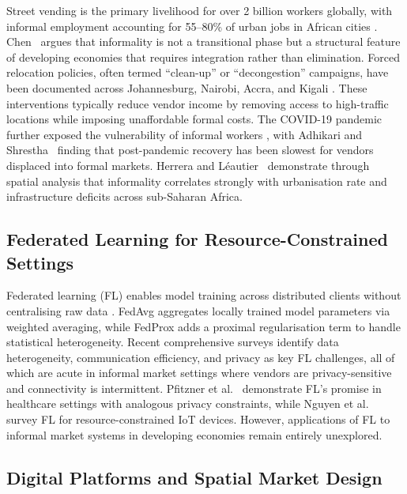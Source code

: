 \documentclass{article}
\begin{document}
Street vending is the primary livelihood for over 2 billion workers globally, with informal employment accounting for 55--80\% of urban jobs in African cities \cite{ilo2023weso}.
Chen~ argues that informality is not a transitional phase but a structural feature of developing economies that requires integration rather than elimination.
Forced relocation policies, often termed ``clean-up'' or ``decongestion'' campaigns, have been documented across Johannesburg, Nairobi, Accra, and Kigali \cite{roever2023street}.
These interventions typically reduce vendor income by removing access to high-traffic locations while imposing unaffordable formal costs.
The COVID-19 pandemic further exposed the vulnerability of informal workers \cite{skinner2021covid}, with Adhikari and Shrestha~ finding that post-pandemic recovery has been slowest for vendors displaced into formal markets.
Herrera and L\'{e}autier~ demonstrate through spatial analysis that informality correlates strongly with urbanisation rate and infrastructure deficits across sub-Saharan Africa.

\subsection{Federated Learning for Resource-Constrained Settings}

Federated learning (FL) enables model training across distributed clients without centralising raw data \cite{mcmahan2017communication,kairouz2021advances}.
FedAvg aggregates locally trained model parameters via weighted averaging, while FedProx \cite{li2020federated} adds a proximal regularisation term to handle statistical heterogeneity.
Recent comprehensive surveys \cite{zhang2022fedsurvey,wen2023survey} identify data heterogeneity, communication efficiency, and privacy as key FL challenges, all of which are acute in informal market settings where vendors are privacy-sensitive and connectivity is intermittent.
Pfitzner et al.~ demonstrate FL's promise in healthcare settings with analogous privacy constraints, while Nguyen et al.~ survey FL for resource-constrained IoT devices.
However, applications of FL to informal market systems in developing economies remain entirely unexplored.

\subsection{Digital Platforms and Spatial Market Design}
\end{document}
